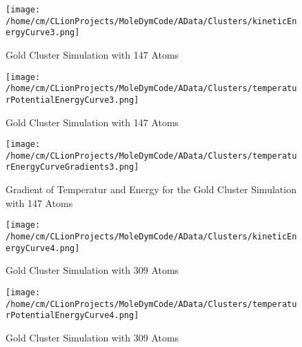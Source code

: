 \begin{figure}[!h] 
    \begin{center} 
        \texttt{[image: /home/cm/CLionProjects/MoleDymCode/AData/Clusters/kineticEnergyCurve3.png]} 
    \end{center} 
    \caption[Gold Cluster Simulation with 147 Atoms]{Gold Cluster Simulation with 147 Atoms} 
    \label{GoldClusterSimulationKineticTime147} 
\end{figure} 
 
\begin{figure}[!h] 
    \begin{center} 
        \texttt{[image: /home/cm/CLionProjects/MoleDymCode/AData/Clusters/temperaturPotentialEnergyCurve3.png]} 
    \end{center} 
    \caption[Gold Cluster Simulation with 147 Atoms]{Gold Cluster Simulation with 147 Atoms} 
    \label{GoldClusterSimulationTemperaturEnergy147} 
\end{figure} 
 
\begin{figure}[!h] 
    \begin{center} 
        \texttt{[image: /home/cm/CLionProjects/MoleDymCode/AData/Clusters/temperaturEnergyCurveGradients3.png]} 
    \end{center} 
    \caption[Gradient of Temperatur and Energy for the Gold Cluster Simulation with 147 Atoms]{Gradient of Temperatur and Energy for the Gold Cluster Simulation with 147 Atoms} 
    \label{GoldClusterSimulationGradient147} 
\end{figure} 
 
\begin{figure}[!h] 
    \begin{center} 
        \texttt{[image: /home/cm/CLionProjects/MoleDymCode/AData/Clusters/kineticEnergyCurve4.png]} 
    \end{center} 
    \caption[Gold Cluster Simulation with 309 Atoms]{Gold Cluster Simulation with 309 Atoms} 
    \label{GoldClusterSimulationKineticTime309} 
\end{figure} 
 
\begin{figure}[!h] 
    \begin{center} 
        \texttt{[image: /home/cm/CLionProjects/MoleDymCode/AData/Clusters/temperaturPotentialEnergyCurve4.png]} 
    \end{center} 
    \caption[Gold Cluster Simulation with 309 Atoms]{Gold Cluster Simulation with 309 Atoms} 
    \label{GoldClusterSimulationTemperaturEnergy309} 
\end{figure} 
 
